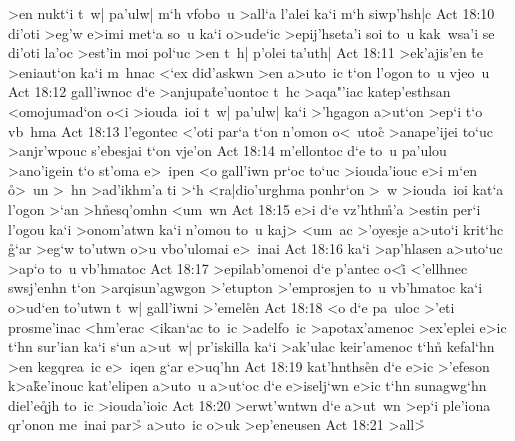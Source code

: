 >en
nukt`i
t~w|
pa'ulw|
m`h
vfobo~u
>all`a
l'alei
ka`i
m`h
siwp'hsh|c\bibvsend
\vs Act 18:10
di'oti
>eg'w
e>imi
met`a
so~u
ka`i
o>ude`ic
>epij'hseta'i
soi
to~u
kak~wsa'i
se
di'oti
la'oc
>est'in
moi
pol`uc
>en
t~h|
p'olei
ta'uth|\bibvsend
\vs Act 18:11
>ek'ajis'en
\r{t}e
>eniaut`on
ka`i
m~hnac
<`ex
did'askwn
>en
a>uto~ic
t`on
l'ogon
to~u
vjeo~u\bibvsend
\vs Act 18:12
gall'iwnoc
d`e
>anjupa\r{t}e'uontoc
t~hc
>aqa"'iac
katep'esthsan
<omojumad`on
o<i
>iouda~ioi
t~w|
pa'ulw|
ka`i
>'hgagon
a>ut`on
>ep`i
t`o
vb~hma\bibvsend
\vs Act 18:13
l'egontec
<'oti
par`a
t`on
n'omon
o<~utoc\r{}
>anape'ijei
to`uc
>anjr'wpouc
s'ebesjai
t`on
vje'on\bibvsend
\vs Act 18:14
m'ellontoc
d`e
to~u
pa'ulou
>ano'igein
t`o
st'oma
e>~ipen
<o
gall'iwn
pr`oc
to`uc
>iouda'iouc
e>i
m`en
\r{o}>~un
>~hn
>ad'ikhm'a
ti
>`h
<ra|dio'urghma
ponhr`on
>~w
>iouda~ioi
kat`a
l'ogon
>`an
>h\r{n}esq'omhn
<um~wn\bibvsend
\vs Act 18:15
e>i
d`e
vz'hth\r{m}'a
>estin
per`i
l'ogou
ka`i
>onom'atwn
ka`i
n'omou
to~u
kaj>
<um~ac
>'oyesje
a>uto`i
krit`hc
\r{g}`ar
>eg`w
to'utwn
o>u
vbo'ulomai
e>~inai\bibvsend
\vs Act 18:16
ka`i
>ap'hlasen
a>uto`uc
>ap`o
to~u
vb'hmatoc\bibvsend
\vs Act 18:17
>epilab'omenoi
d`e
p'antec
o<i\r{}
<'ellhnec
swsj'enhn
t`on
>arqisun'agwgon
>'etupton
>'emprosjen
to~u
vb'hmatoc
ka`i
o>ud`en
to'utwn
t~w|
gall'iwni
>'emel\r{e}n\bibvsend
{}
\vs Act 18:18
<o
d`e
pa~uloc
>'eti
prosme'inac
<hm'erac
<ikan`ac
to~ic
>adelfo~ic
>apotax'amenoc
>ex'eplei
e>ic
t`hn
sur'ian
ka`i
s`un
a>ut~w|
pr'iskilla
ka`i
>ak'ulac
keir'amenoc
t`hn\r{}
kefal`hn
>en
kegqrea~ic
e>~iqen
g`ar
e>uq'hn\bibvsend
\vs Act 18:19
kat'hnths\r{e}n
d`e
e>ic
>'efeson
k>a\r{k}e'inouc
kat'elipen
a>uto~u
a>ut`oc
d`e
e>iselj`wn
e>ic
t`hn
sunagwg`hn
diel'e\r{q}jh
to~ic
>iouda'ioic\bibvsend
\vs Act 18:20
>erwt'wntwn
d`e
a>ut~wn
>ep`i
ple'iona
qr'onon
me~inai
par>\r{}
a>uto~ic
o>uk
>ep'eneusen\bibvsend
\vs Act 18:21
>all>\r{}
